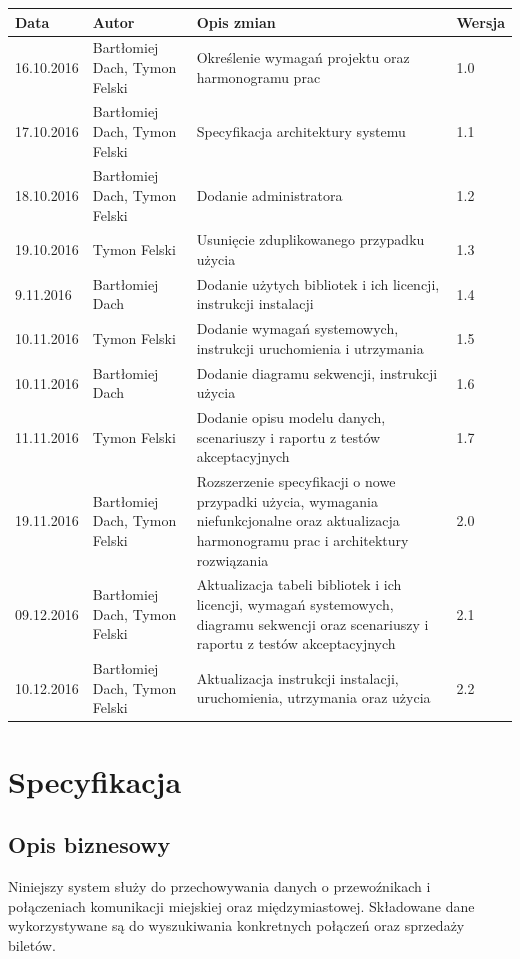 \documentclass[10pt,a4paper]{article}
\begin{document}
\begin{table}[H]
\def\arraystretch{1.5}
\begin{tabularx}{\textwidth}{|l|l|X|l|}
	\hline
	\textbf{Data} & \textbf{Autor} & \textbf{Opis zmian} & \textbf{Wersja} \\
	\hline
	16.10.2016 & Bartłomiej Dach, Tymon Felski & Określenie wymagań projektu oraz harmonogramu prac & 1.0 \\
	\hline
	17.10.2016 & Bartłomiej Dach, Tymon Felski & Specyfikacja architektury systemu & 1.1 \\
	\hline
	18.10.2016 & Bartłomiej Dach, Tymon Felski & Dodanie administratora & 1.2 \\
	\hline
	19.10.2016 & Tymon Felski & Usunięcie zduplikowanego przypadku użycia & 1.3 \\
	\hline
	9.11.2016 & Bartłomiej Dach & Dodanie użytych bibliotek i ich licencji, instrukcji instalacji & 1.4 \\
	\hline
	10.11.2016 & Tymon Felski & Dodanie wymagań systemowych, instrukcji uruchomienia i utrzymania & 1.5 \\
	\hline
	10.11.2016 & Bartłomiej Dach & Dodanie diagramu sekwencji, instrukcji użycia & 1.6 \\
	\hline
	11.11.2016 & Tymon Felski & Dodanie opisu modelu danych, scenariuszy i raportu z testów akceptacyjnych & 1.7 \\
	\hline
	19.11.2016 & Bartłomiej Dach, Tymon Felski & Rozszerzenie specyfikacji o nowe przypadki użycia, wymagania niefunkcjonalne oraz aktualizacja harmonogramu prac i architektury rozwiązania & 2.0 \\
	\hline
	09.12.2016 & Bartłomiej Dach, Tymon Felski & Aktualizacja tabeli bibliotek i ich licencji, wymagań systemowych, diagramu sekwencji oraz scenariuszy i raportu z testów akceptacyjnych & 2.1 \\
	\hline
	10.12.2016 & Bartłomiej Dach, Tymon Felski & Aktualizacja instrukcji instalacji, uruchomienia, utrzymania oraz użycia & 2.2 \\
	\hline
\end{tabularx}
\end{table}

\newpage
\tableofcontents
\newpage

\section{Specyfikacja}

\subsection{Opis biznesowy}
Niniejszy system służy do przechowywania danych o przewoźnikach i połączeniach komunikacji miejskiej oraz międzymiastowej. Składowane dane wykorzystywane są do wyszukiwania konkretnych połączeń oraz sprzedaży biletów.
\end{document}
